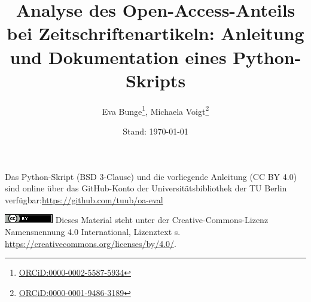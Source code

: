 \documentclass[a4paper,11pt]{scrartcl}
\title{\Large Analyse des Open-Access-Anteils bei Zeitschriftenartikeln: Anleitung und Dokumentation eines Python-Skripts}
\author{\normalsize
Eva Bunge\affaddr \thanks{\href{http://orcid.org/0000-0002-5587-5934}{ORCiD:0000-0002-5587-5934}}, Michaela Voigt\affaddr \thanks{\href{http://orcid.org/0000-0001-9486-3189}{ORCiD:0000-0001-9486-3189}}\\
\affaddr{Technische Universität Berlin, Universitätsbibliothek}}
\date{\normalsize Stand: \today}
\begin{document}
\maketitle
Das Python-Skript (BSD 3-Clause) und die vorliegende Anleitung (CC BY 4.0) sind online über das GitHub-Konto der Universitätsbibliothek der TU Berlin verfügbar:\newline \url{https://github.com/tuub/oa-eval}

\includegraphics[width=0.075\textheight]{80x15.png}
Dieses Material steht unter der Creative-Commons-Lizenz Namensnennung 4.0 International, Lizenztext s. \url{https://creativecommons.org/licenses/by/4.0/}.

\tableofcontents
\pagebreak

\pagestyle{headings}




\end{document}
